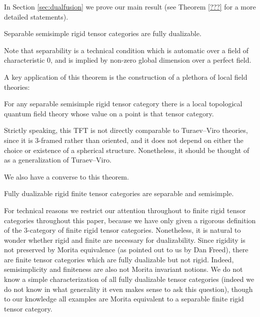 \documentclass{amsart}
\begin{document}
In Section \ref{sec:dualfusion} we prove our main result (see Theorem \ref{???} for a more detailed statements).


\begin{maintheorem}
Separable semisimple rigid tensor categories are fully dualizable.
\end{maintheorem}

\nid Note that separability is a technical condition which is automatic over a field of characteristic $0$, and is implied by non-zero global dimension over a perfect field.


A key application of this theorem is the construction of a plethora of local field theories:
\begin{maincor}
For any separable semisimple rigid tensor category there is a local topological quantum field theory whose value on a point is that tensor category.
\end{maincor}

\nid Strictly speaking, this TFT is not directly comparable to Turaev--Viro theories, since it is $3$-framed rather than oriented, and it does not depend on either the choice or existence of a spherical structure.  Nonetheless, it should be thought of as a generalization of Turaev--Viro.

We also have a converse to this theorem.

\begin{maintheorem}
Fully dualizable rigid finite tensor categories are separable and semisimple.
\end{maintheorem}

For technical reasons we restrict our attention throughout to finite rigid tensor categories throughout this paper, because we have only given a rigorous definition of the $3$-category of finite rigid tensor categories.  Nonetheless, it is natural to wonder whether rigid and finite are necessary for dualizability.  Since rigidity is not preserved by Morita equivalence (as pointed out to us by Dan Freed), there are finite tensor categories which are fully dualizable but not rigid.  Indeed, semisimplicity and finiteness are also not Morita invariant notions.  We do not know a simple characterization of all fully dualizable tensor categories (indeed we do not know in what generality it even makes sense to ask this question), though to our knowledge all examples are Morita equivalent to a separable finite rigid tensor category.
\end{document}
